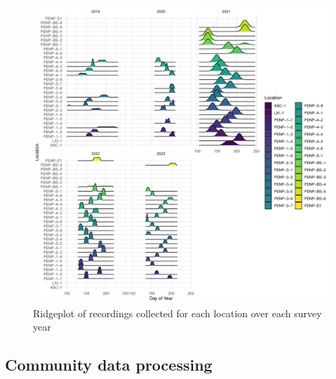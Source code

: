\documentclass[
  letterpaper,
  DIV=11,
  numbers=noendperiod,
  oneside]{scrartcl}
\begin{document}
\begin{figure}

{\centering \includegraphics{peinp_files/figure-pdf/fig-recs-collect-1.pdf}

}

\caption{\label{fig-recs-collect}Ridgeplot of recordings collected for
each location over each survey year}

\end{figure}

\hypertarget{community-data-processing}{%
\subsection{Community data processing}\label{community-data-processing}}
\end{document}
